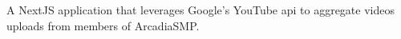 

{A NextJS application that leverages Google's YouTube api to aggregate videos uploads from members of ArcadiaSMP.}